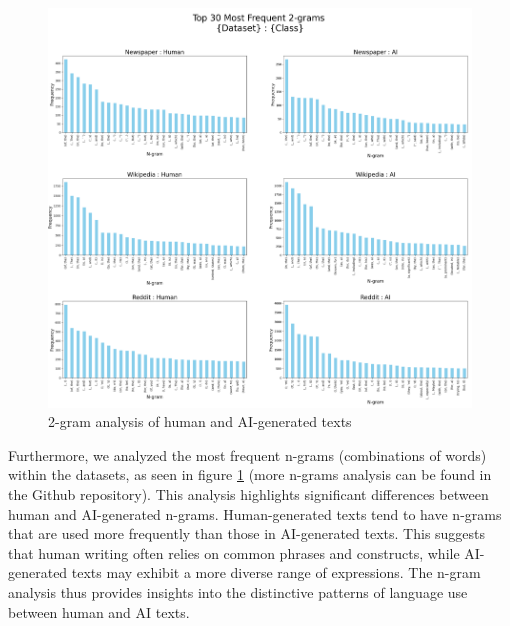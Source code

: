 \documentclass[11pt]{article}
\begin{document}
\begin{figure}[H]
  \centering
  \includegraphics[width=\linewidth]{2_grams.png}
  \caption{2-gram analysis of human and AI-generated texts}
  \label{fig:n-grams}
\end{figure}
Furthermore, we analyzed the most frequent n-grams (combinations of words) within the datasets, as seen in figure \ref{fig:n-grams} (more n-grams analysis can be found in the Github repository). This analysis highlights significant differences between human and AI-generated n-grams. Human-generated texts tend to have n-grams that are used more frequently than those in AI-generated texts. This suggests that human writing often relies on common phrases and constructs, while AI-generated texts may exhibit a more diverse range of expressions. The n-gram analysis thus provides insights into the distinctive patterns of language use between human and AI texts.
\end{document}

